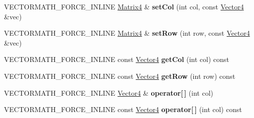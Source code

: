 \begin{DoxyCompactItemize}
\mbox{\label{classVectormath_1_1Aos_1_1Matrix4_a1cc572f1afe0abba620ed52463f85846}} 
V\+E\+C\+T\+O\+R\+M\+A\+T\+H\+\_\+\+F\+O\+R\+C\+E\+\_\+\+I\+N\+L\+I\+NE \hyperlink{classVectormath_1_1Aos_1_1Matrix4}{Matrix4} \& {\bfseries set\+Col} (int col, const \hyperlink{classVectormath_1_1Aos_1_1Vector4}{Vector4} \&vec)
\item 
\mbox{\label{classVectormath_1_1Aos_1_1Matrix4_aa973863bc1d06a93d9cdbf8f17a504ec}} 
V\+E\+C\+T\+O\+R\+M\+A\+T\+H\+\_\+\+F\+O\+R\+C\+E\+\_\+\+I\+N\+L\+I\+NE \hyperlink{classVectormath_1_1Aos_1_1Matrix4}{Matrix4} \& {\bfseries set\+Row} (int row, const \hyperlink{classVectormath_1_1Aos_1_1Vector4}{Vector4} \&vec)
\item 
\mbox{\label{classVectormath_1_1Aos_1_1Matrix4_a7ee299c07ce0208828540034ae2208e9}} 
V\+E\+C\+T\+O\+R\+M\+A\+T\+H\+\_\+\+F\+O\+R\+C\+E\+\_\+\+I\+N\+L\+I\+NE const \hyperlink{classVectormath_1_1Aos_1_1Vector4}{Vector4} {\bfseries get\+Col} (int col) const
\item 
\mbox{\label{classVectormath_1_1Aos_1_1Matrix4_aac94b851717068731faa29f0d2ed2d45}} 
V\+E\+C\+T\+O\+R\+M\+A\+T\+H\+\_\+\+F\+O\+R\+C\+E\+\_\+\+I\+N\+L\+I\+NE const \hyperlink{classVectormath_1_1Aos_1_1Vector4}{Vector4} {\bfseries get\+Row} (int row) const
\item 
\mbox{\label{classVectormath_1_1Aos_1_1Matrix4_af36875c0af894fab9226e6b21e466884}} 
V\+E\+C\+T\+O\+R\+M\+A\+T\+H\+\_\+\+F\+O\+R\+C\+E\+\_\+\+I\+N\+L\+I\+NE \hyperlink{classVectormath_1_1Aos_1_1Vector4}{Vector4} \& {\bfseries operator\mbox{[}$\,$\mbox{]}} (int col)
\item 
\mbox{\label{classVectormath_1_1Aos_1_1Matrix4_af6d6875c899486d5fe76760824c93da1}} 
V\+E\+C\+T\+O\+R\+M\+A\+T\+H\+\_\+\+F\+O\+R\+C\+E\+\_\+\+I\+N\+L\+I\+NE const \hyperlink{classVectormath_1_1Aos_1_1Vector4}{Vector4} {\bfseries operator\mbox{[}$\,$\mbox{]}} (int col) const
\item 
\mbox{\label{classVectormath_1_1Aos_1_1Matrix4_aa3816590c2f9bc523410259e83f47056}} 

\end{DoxyCompactItemize}
